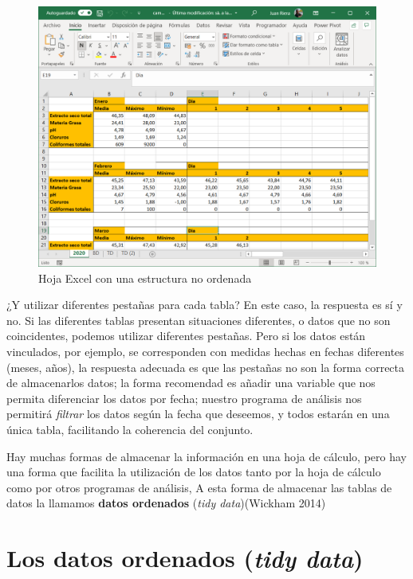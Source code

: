 \documentclass[
  letterpaper,
  DIV=11,
  numbers=noendperiod,
  oneside]{scrreprt}
\begin{document}
\begin{figure}

{\centering \includegraphics{01-imagenes/2021-09-1_excel_1.png}

}

\caption{\label{fig-2021-09-1_excel_1}Hoja Excel con una estructura no
ordenada}

\end{figure}

¿Y utilizar diferentes pestañas para cada tabla? En este caso, la
respuesta es sí y no. Si las diferentes tablas presentan situaciones
diferentes, o datos que no son coincidentes, podemos utilizar diferentes
pestañas. Pero si los datos están vinculados, por ejemplo, se
corresponden con medidas hechas en fechas diferentes (meses, años), la
respuesta adecuada es que las pestañas no son la forma correcta de
almacenarlos datos; la forma recomendad es añadir una variable que nos
permita diferenciar los datos por fecha; nuestro programa de análisis
nos permitirá \emph{filtrar} los datos según la fecha que deseemos, y
todos estarán en una única tabla, facilitando la coherencia del
conjunto.

Hay muchas formas de almacenar la información en una hoja de cálculo,
pero hay una forma que facilita la utilización de los datos tanto por la
hoja de cálculo como por otros programas de análisis, A esta forma de
almacenar las tablas de datos la llamamos \textbf{datos ordenados}
(\emph{tidy data})(Wickham 2014)

\hypertarget{los-datos-ordenados-tidy-data}{%
\section{\texorpdfstring{Los datos ordenados (\emph{tidy
data})}{Los datos ordenados (tidy data)}}\label{los-datos-ordenados-tidy-data}}
\end{document}
